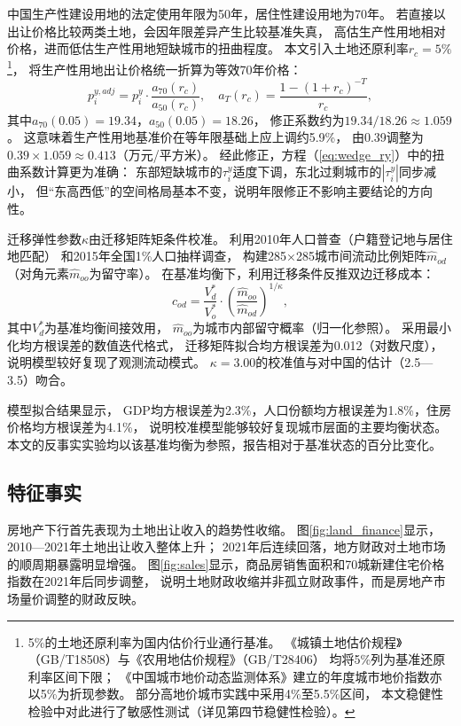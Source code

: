 \documentclass[UTF8,a4paper,12pt]{ctexart}
\theoremstyle{plain}
\theoremstyle{definition}
\theoremstyle{remark}
\newcommand{\tauy}{\tau^{y}}
\begin{document}
中国生产性建设用地的法定使用年限为50年，居住性建设用地为70年。
若直接以出让价格比较两类土地，会因年限差异产生比较基准失真，
高估生产性用地相对价格，进而低估生产性用地短缺城市的扭曲程度。
本文引入土地还原利率$r_c=5\%$\footnote{%
  5\%的土地还原利率为国内估价行业通行基准。
  《城镇土地估价规程》（GB/T18508）与《农用地估价规程》（GB/T28406）
  均将5\%列为基准还原利率区间下限；
  《中国城市地价动态监测体系》建立的年度城市地价指数亦以5\%为折现参数。
  部分高地价城市实践中采用4\%至5.5\%区间，
  本文稳健性检验中对此进行了敏感性测试（详见第四节稳健性检验）。}，
将生产性用地出让价格统一折算为等效70年价格：
\begin{equation}
  p_i^{y,adj}=p_i^y\cdot\frac{a_{70}(r_c)}{a_{50}(r_c)},
  \quad a_T(r_c)=\frac{1-(1+r_c)^{-T}}{r_c},
  \label{eq:land_adj}
\end{equation}
其中$a_{70}(0.05)=19.34$，$a_{50}(0.05)=18.26$，
修正系数约为$19.34/18.26\approx 1.059$。
这意味着生产性用地基准价在等年限基础上应上调约5.9\%，
由0.39调整为$0.39\times1.059\approx0.413$（万元/平方米）。
经此修正，方程（\ref{eq:wedge_ry}）中的扭曲系数计算更为准确：
东部短缺城市的$\tauy_i$适度下调，东北过剩城市的$|\tauy_i|$同步减小，
但``东高西低''的空间格局基本不变，说明年限修正不影响主要结论的方向性。

迁移弹性参数$\kappa$由迁移矩阵矩条件校准。
利用2010年人口普查（户籍登记地与居住地匹配）
和2015年全国1\%人口抽样调查，
构建285×285城市间流动比例矩阵$\hat{m}_{od}$（对角元素$\hat{m}_{oo}$为留守率）。
在基准均衡下，利用迁移条件反推双边迁移成本：
\begin{equation}
  c_{od}=\frac{V_d^*}{V_o^*}\cdot\left(\frac{\hat{m}_{oo}}{\hat{m}_{od}}\right)^{1/\kappa},
  \label{eq:mig_cost}
\end{equation}
其中$V_d^*$为基准均衡间接效用，
$\hat{m}_{oo}$为城市内部留守概率（归一化参照）。
采用最小化均方根误差的数值迭代格式，
迁移矩阵拟合均方根误差为0.012（对数尺度），
说明模型较好复现了观测流动模式。
$\kappa=3.00$的校准值与\citet{redding2017}对中国的估计（2.5—3.5）吻合。

模型拟合结果显示，
GDP均方根误差为2.3\%，人口份额均方根误差为1.8\%，住房价格均方根误差为4.1\%，
说明校准模型能够较好复现城市层面的主要均衡状态。
本文的反事实实验均以该基准均衡为参照，报告相对于基准状态的百分比变化。

\subsection{特征事实}

房地产下行首先表现为土地出让收入的趋势性收缩。
图\ref{fig:land_finance}显示，2010—2021年土地出让收入整体上升；
2021年后连续回落，地方财政对土地市场的顺周期暴露明显增强。
图\ref{fig:sales}显示，商品房销售面积和70城新建住宅价格指数在2021年后同步调整，
说明土地财政收缩并非孤立财政事件，而是房地产市场量价调整的财政反映。
\end{document}
